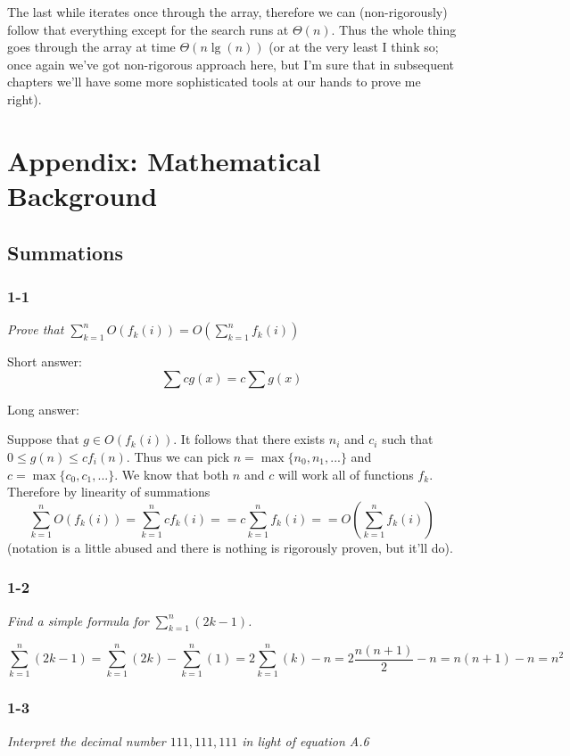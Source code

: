 \documentclass[11pt,oneside,titlepage]{book}
\begin{document}
The last while iterates once through the array, therefore we can (non-rigorously) follow that
everything except for the search runs at $\Theta(n)$. Thus the whole thing goes
through the array at time $\Theta(n \lg(n))$  (or at the very least I think so; once again we've
got non-rigorous approach here, but I'm sure that in subsequent chapters we'll have some
more sophisticated tools at our hands to prove me right).


\part{Appendix: Mathematical Background}
\chapter{Summations}

\section*{1-1}
\textit{Prove that $\sum_{k  = 1}^n{O(f_k(i))} = O(\sum_{k  = 1}^n{f_k(i)})$}

Short answer:
$$\sum cg(x) = c\sum{g(x)}$$

Long answer:

Suppose that $g \in O(f_k(i))$. It follows that there exists $n_i$ and $c_i$
such that $0 \leq g(n) \leq cf_i(n)$. Thus we can pick
$n = \max\{n_0, n_1, ...\}$ and $c = \max\{c_0, c_1, ... \}$. We know that
both $n$ and $c$ will work all of functions $f_k$. Therefore by
linearity of summations
$$\sum_{k  = 1}^n{O(f_k(i))}
= \sum_{k  = 1}^n{cf_k(i)} =
= c\sum_{k  = 1}^n{f_k(i)} = 
= O(\sum_{k  = 1}^n{f_k(i)})$$
(notation is a little abused and there is nothing is rigorously
proven, but it'll do).

\section*{1-2}
\textit{Find a simple formula for $\sum_{k = 1}^n{(2k - 1)}$.}

$$\sum_{k = 1}^n{(2k - 1)} =
\sum_{k = 1}^n{(2k)} - \sum_{k = 1}^n{(1)} =
2\sum_{k = 1}^n{(k)} - n =
2\frac{n(n + 1)}{2} - n =
n(n + 1) - n =
n^2
$$


\section*{1-3}
\textit{Interpret the decimal number $111,111,111$ in light of equation A.6}
\end{document}
